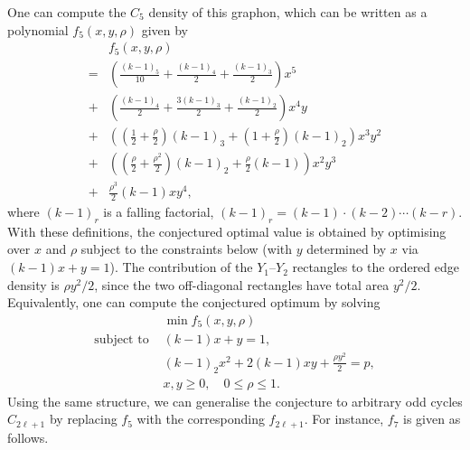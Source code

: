 \documentclass[11pt]{article}
\theoremstyle{plain}
\theoremstyle{definition}
\theoremstyle{remark}
\begin{document}
One can compute the $C_5$ density of this graphon, which can be written as a polynomial $f_5(x, y, \rho)$ given by
\begin{align*}
    &f_5(x, y, \rho)
    \\
    {} = &\left(\frac{(k-1)_5}{10} + \frac{(k-1)_4}{2} + \frac{(k-1)_3}{2} \right)x^5
    \\
    {} + &\left( \frac{(k-1)_4}{2} + \frac{3(k-1)_3}{2} + \frac{(k-1)_2}{2}\right)x^4 y
    \\
    {} + &\left(\left(\frac{1}{2} + \frac{\rho}{2}\right) (k-1)_3 + \left(1 + \frac{\rho}{2}\right) (k-1)_2\right) x^3 y^2
    \\
    {} + &\left( \left(\frac{\rho}{2} + \frac{\rho^2}{2}\right) (k-1)_2 + \frac{\rho}{2}(k-1) \right) x^2 y^3
    \\
    {} + &\frac{\rho^3}{2} (k-1) xy^4,
\end{align*}
where $(k-1)_r$ is a falling factorial, $(k-1)_r = (k-1) \cdot (k-2) \cdots (k-r)$.
With these definitions, the conjectured optimal value is obtained by optimising over $x$ and $\rho$ subject to the constraints below (with $y$ determined by $x$ via $(k-1)x + y = 1$).
The contribution of the $Y_1$--$Y_2$ rectangles to the ordered edge density is $\rho y^2/2$, since the two off-diagonal rectangles have total area $y^2/2$.
Equivalently, one can compute the conjectured optimum by solving
\begin{align*}
    &\min f_5(x, y, \rho)
    \\
  \text{subject to } & (k-1) x + y = 1,
    \\
    & (k-1)_2 x^2 + 2 (k-1) xy + \frac{\rho y^2}{2} = p,
    \\
    & x, y \ge 0, \quad 0 \le \rho \le 1.
\end{align*}
Using the same structure, we can generalise the conjecture to arbitrary odd cycles $C_{2\ell+1}$ by replacing $f_5$ with the corresponding $f_{2\ell+1}$.
For instance, $f_7$ is given as follows.
\end{document}
